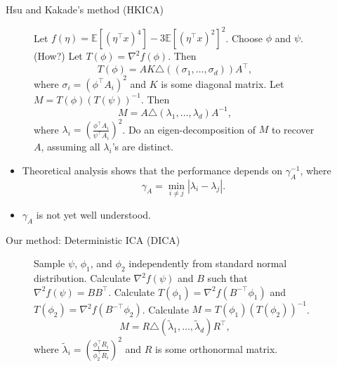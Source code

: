 \documentclass[final]{beamer} %
\newcommand{\EEp}[1]{\mathbb{E}\left[#1\right]}
\begin{document}
\begin{frame}[c]
\begin{columns}[t,totalwidth=\textwidth]
	\begin{column}{0.01\textwidth}
	\end{column}
	\begin{column}{0.32\textwidth}
			\begin{block}{Hsu and Kakade's method (HKICA)}
				\begin{figure}
				\begin{algorithmic}[1]
					\STATE Let $f(\eta) = \EEp{(\eta^{\top}x)^4} - 3 \EEp{(\eta^{\top}x)^2}^2$.
					\STATE  Choose $\phi$ and $\psi$. (How?)
					\STATE Let $T(\phi) = \nabla^2 f(\phi)$. Then 
						\[T(\phi) = AK \triangle\left( (\sigma_1,\ldots,  \sigma_d)\right)A^{\top},
						\]
						where $\sigma_i = \left(\phi^{\top}A_i\right)^2$ and $K$ is some diagonal matrix.
					\STATE Let $M = T(\phi)(T(\psi))^{-1}$. Then 
						\[M = A \triangle \left( \lambda_1, \ldots, \lambda_d \right) A^{-1},
						\]
						where $\lambda_i = \left(\frac{\phi^{\top}A_i}{\psi^{\top}A_i}\right)^2$.
					\STATE Do an eigen-decomposition of $M$ to recover $A$, assuming all $\lambda_i$'s are distinct.
				\end{algorithmic}
				\end{figure}
				\begin{itemize}
					\item Theoretical analysis shows that the performance depends on $\gamma_A^{-1}$,
					where
						\[
						\gamma_A = \min_{i\neq j} \left\vert \lambda_i - \lambda_j\right \vert.
						\]
					\vspace{-1cm}
					\item $\gamma_A$ is not yet well understood.
				\end{itemize}
			\end{block}
			\vspace{0.5ex}
		\begin{block}{Our method: Deterministic ICA (DICA)}		
			\begin{figure}
			\begin{algorithmic}[1]
				\STATE Sample $\psi$, $\phi_1$, and $\phi_2$ independently from standard normal distribution.
				\STATE Calculate $\nabla^2 f(\psi)$ and $B$ such that $\nabla^2 f(\psi) = BB^{\top}$.
				\STATE Calculate $T(\phi_1) = \nabla^2 f(B^{-\top}\phi_1)$ and $T(\phi_2) = \nabla^2 f(B^{-\top}\phi_2)$.
				\STATE Calculate $M = T(\phi_1)(T(\phi_2))^{-1}$.
					\[
					M = R \triangle\left( \tilde{\lambda}_1, \ldots, \tilde{\lambda}_d \right)R^{\top},
					\]
					where $\tilde{\lambda}_i = \left(\frac{\phi_1^{\top}R_i}{\phi_2^{\top}R_i}\right)^2$ and $R$ is some orthonormal matrix.

\end{algorithmic}
\end{figure}
\end{block}
\end{column}
\end{columns}
\end{frame}
\end{document}
